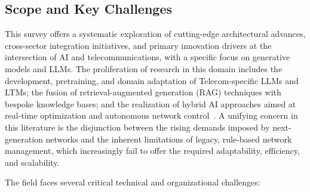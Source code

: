 \subsection{Scope and Key Challenges}

This survey offers a systematic exploration of cutting-edge architectural advances, cross-sector integration initiatives, and primary innovation drivers at the intersection of AI and telecommunications, with a specific focus on generative models and LLMs. The proliferation of research in this domain includes the development, pretraining, and domain adaptation of Telecom-specific LLMs and LTMs; the fusion of retrieval-augmented generation (RAG) techniques with bespoke knowledge bases; and the realization of hybrid AI approaches aimed at real-time optimization and autonomous network control~\cite{ref1, ref2, ref3, ref4, ref5, ref6, ref7, ref8, ref9, ref10, ref11, ref12, ref13, ref14, ref15, ref16, ref17, ref18, ref19, ref20, ref21, ref22, ref23, ref24, ref25, ref26, ref27, ref28, ref29, ref30, ref31, ref32, ref33, ref34, ref35, ref36, ref37, ref38, ref39, ref40, ref46, ref49}. A unifying concern in this literature is the disjunction between the rising demands imposed by next-generation networks and the inherent limitations of legacy, rule-based network management, which increasingly fail to offer the required adaptability, efficiency, and scalability.

The field faces several critical technical and organizational challenges:

